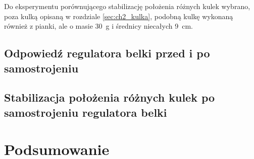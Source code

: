 Do eksperymentu porównującego stabilizację położenia różnych kulek wybrano, poza kulką opisaną w rozdziale \ref{sec:ch2_kulka}, podobną kulkę wykonaną również z pianki, ale o masie \SI{30}{\gram} i średnicy niecałych \SI{9}{\centi\meter}.


\subsection{Odpowiedź regulatora belki przed i po samostrojeniu}
\label{subsec:ch9_odp_regulatora_belki}


\subsection{Stabilizacja położenia różnych kulek po samostrojeniu regulatora belki}
\label{subsec:ch9_stabilizacja_polozenia_roznych_kulek_po_samostrojeniu}


\section{Podsumowanie}




